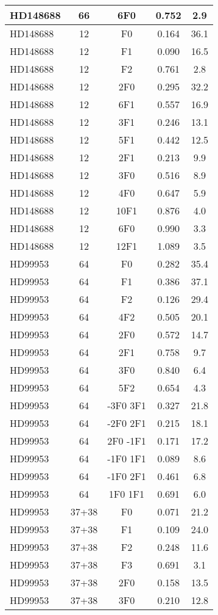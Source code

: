 \begin{table*}
\begin{tabular}{l c c c c}
HD148688 & 66 & 6F0 & 0.752 & 2.9\\ 
\hline
HD148688 & 12 & F0 & 0.164 & 36.1\\ 
HD148688 & 12 & F1 & 0.090 & 16.5\\ 
HD148688 & 12 & F2 & 0.761 & 2.8\\ 
HD148688 & 12 & 2F0 & 0.295 & 32.2\\ 
HD148688 & 12 & 6F1 & 0.557 & 16.9\\ 
HD148688 & 12 & 3F1 & 0.246 & 13.1\\ 
HD148688 & 12 & 5F1 & 0.442 & 12.5\\ 
HD148688 & 12 & 2F1 & 0.213 & 9.9\\ 
HD148688 & 12 & 3F0 & 0.516 & 8.9\\ 
HD148688 & 12 & 4F0 & 0.647 & 5.9\\ 
HD148688 & 12 & 10F1 & 0.876 & 4.0\\ 
HD148688 & 12 & 6F0 & 0.990 & 3.3\\ 
HD148688 & 12 & 12F1 & 1.089 & 3.5\\ 
\hline
HD99953 & 64 & F0 & 0.282 & 35.4\\ 
HD99953 & 64 & F1 & 0.386 & 37.1\\ 
HD99953 & 64 & F2 & 0.126 & 29.4\\ 
HD99953 & 64 & 4F2 & 0.505 & 20.1\\ 
HD99953 & 64 & 2F0 & 0.572 & 14.7\\ 
HD99953 & 64 & 2F1 & 0.758 & 9.7\\ 
HD99953 & 64 & 3F0 & 0.840 & 6.4\\ 
HD99953 & 64 & 5F2 & 0.654 & 4.3\\ 
HD99953 & 64 & -3F0 3F1 & 0.327 & 21.8\\ 
HD99953 & 64 & -2F0 2F1 & 0.215 & 18.1\\ 
HD99953 & 64 & 2F0 -1F1 & 0.171 & 17.2\\ 
HD99953 & 64 & -1F0 1F1 & 0.089 & 8.6\\ 
HD99953 & 64 & -1F0 2F1 & 0.461 & 6.8\\ 
HD99953 & 64 & 1F0 1F1 & 0.691 & 6.0\\ 
\hline
HD99953 & 37+38 & F0 & 0.071 & 21.2\\ 
HD99953 & 37+38 & F1 & 0.109 & 24.0\\ 
HD99953 & 37+38 & F2 & 0.248 & 11.6\\ 
HD99953 & 37+38 & F3 & 0.691 & 3.1\\ 
HD99953 & 37+38 & 2F0 & 0.158 & 13.5\\ 
HD99953 & 37+38 & 3F0 & 0.210 & 12.8\\ 

\end{tabular}
\end{table*}
